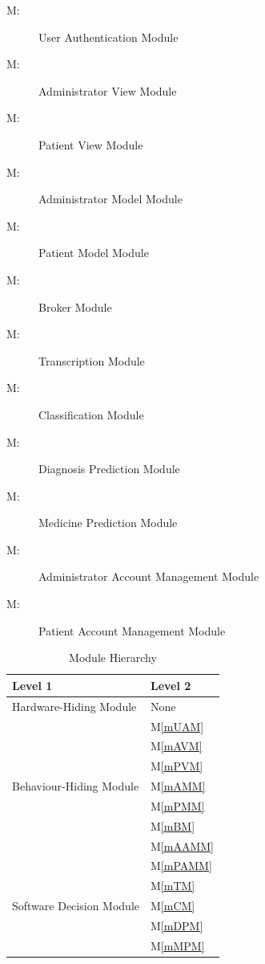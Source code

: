 \documentclass[12pt, titlepage]{article}
\newcounter{mnum}
\newcommand{\mthemnum}{M\themnum}
\newcommand{\mref}[1]{M\ref{#1}}
\begin{document}
\begin{description}
  \item [ \mthemnum \label{mUAM}:] User Authentication Module
  \item [ \mthemnum \label{mAVM}:] Administrator View Module
  \item [ \mthemnum \label{mPVM}:] Patient View Module
  \item [ \mthemnum \label{mAMM}:] Administrator Model Module
  \item [ \mthemnum \label{mPMM}:] Patient Model Module
  \item [ \mthemnum \label{mBM}:] Broker Module
  \item [ \mthemnum \label{mTM}:] Transcription Module
  \item [ \mthemnum \label{mCM}:] Classification Module
  \item [ \mthemnum \label{mDPM}:] Diagnosis Prediction Module
  \item [ \mthemnum \label{mMPM}:] Medicine Prediction Module
  \item [ \mthemnum \label{mAAMM}:] Administrator Account Management Module
  \item [ \mthemnum \label{mPAMM}:] Patient Account Management Module

\end{description}

\begin{table}[h!]
\centering
\begin{tabular}{p{} p{}}
\toprule
\textbf{Level 1} & \textbf{Level 2}\\
\midrule
{Hardware-Hiding Module} & None \\
\midrule
\multirow{7}{0.3\textwidth}{Behaviour-Hiding Module} & \mref{mUAM}\\
& \mref{mAVM}\\
& \mref{mPVM}\\
& \mref{mAMM}\\
& \mref{mPMM}\\
& \mref{mBM}\\
& \mref{mAAMM}\\
& \mref{mPAMM}\\
\midrule

\multirow{3}{0.3\textwidth}{Software Decision Module} & \mref{mTM}\\
& \mref{mCM}\\
& \mref{mDPM}\\
& \mref{mMPM}\\
\bottomrule

\end{tabular}
\caption{Module Hierarchy}
\label{TblMH}
\end{table}
\end{document}
